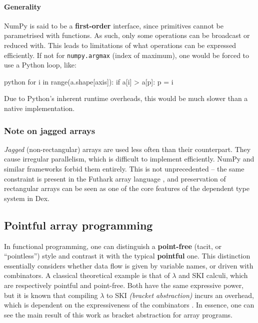 \paragraph{Generality} NumPy is said to be a \textbf{first-order} interface, since primitives cannot be parametrised with functions. As such, only some operations can be broadcast or reduced with. This leads to limitations of what operations can be expressed efficiently. If not for \texttt{numpy.argmax} (index of maximum), one would be forced to use a Python loop, like:
\begin{center}
\begin{cminted}{python}
for i in range(a.shape[axis]): if a[i] > a[p]: p = i
\end{cminted}
\end{center}
Due to Python's inherent runtime overheads, this would be much slower than a native implementation.

\subsubsection{Note on jagged arrays}

\textit{Jagged} (non-rectangular) arrays are used less often than their counterpart. They cause irregular parallelism, which is difficult to implement efficiently. NumPy and similar frameworks forbid them entirely. This is not unprecedented -- the same constraint is present in the Futhark array language \cite{henriksen2017futhark}, and preservation of rectangular arrays can be seen as one of the core features of the dependent type system in Dex.

\subsection{Pointful array programming}

In functional programming, one can distinguish a \textbf{point-free} (tacit, or ``pointless'') style and contrast it with the typical \textbf{pointful} one. This distinction essentially considers whether data flow is given by variable names, or driven with combinators. A classical theoretical example is that of $\lambda$ and SKI calculi, which are respectively pointful and point-free. Both have the same expressive power, but it is known that compiling $\lambda$ to SKI \textit{(bracket abstraction)} incurs an overhead, which is dependent on the expressiveness of the combinators \cite{lachowski2018complexity}. 
In essence, one can see the main result of this work as bracket abstraction for array programs.

